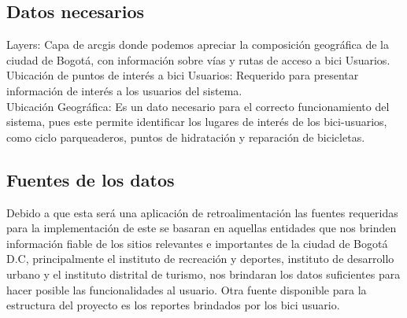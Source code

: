 \subsection{Datos necesarios}

Layers: Capa de arcgis donde podemos apreciar la composición geográfica de la ciudad de Bogotá, con información sobre vías y rutas de acceso a bici Usuarios. \\

Ubicación de puntos de interés a bici Usuarios: Requerido para presentar información de interés a los usuarios del sistema. \\

Ubicación Geográfica: Es un dato necesario para el correcto funcionamiento del sistema, pues este permite identificar los lugares de interés de los bici-usuarios, como ciclo parqueaderos, puntos de hidratación y reparación de bicicletas.


\subsection{Fuentes de los datos}

Debido a que esta será una aplicación de retroalimentación las fuentes requeridas para la implementación de este se basaran en aquellas entidades que nos brinden información fiable de los sitios relevantes e importantes de la ciudad de Bogotá D.C, principalmente el instituto de recreación y deportes, instituto de desarrollo urbano y el instituto distrital de turismo, nos brindaran los datos suficientes para hacer posible las funcionalidades al usuario. Otra fuente disponible para la estructura del proyecto es los reportes brindados por los bici usuario. 

\clearpage